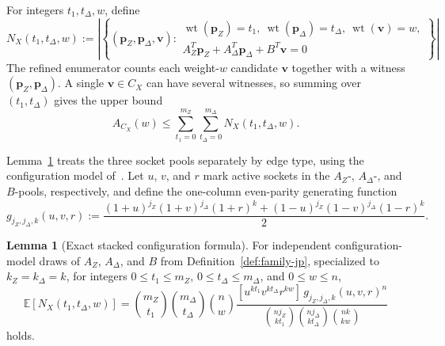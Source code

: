\documentclass[11pt]{article}
\theoremstyle{definition}
\newtheorem{lemma}[theorem]{Lemma}
\newcommand{\EE}{\mathbb E}
\newcommand{\wt}{\operatorname{wt}}
\newcommand{\bp}{\mathbf p}
\newcommand{\bv}{\mathbf v}
\newcommand{\CX}{C_X}
\newcommand{\NX}{N_X}
\begin{document}
For integers \(t_1,t_\Delta,w\), define
\begin{equation*}
\NX(t_1,t_\Delta,w)
:=
\left|
\left\{
(\bp_Z,\bp_\Delta,\bv):
\begin{array}{l}
\wt(\bp_Z)=t_1,\ \wt(\bp_\Delta)=t_\Delta,\ \wt(\bv)=w,\\
A_Z^T \bp_Z+A_\Delta^T \bp_\Delta+B^T \bv=0
\end{array}
\right\}
\right|
\end{equation*}
The refined enumerator counts each weight-\(w\) candidate \(\bv\) together with a witness \((\bp_Z,\bp_\Delta)\). A single \(\bv\in\CX\) can have several witnesses, so summing over \((t_1,t_\Delta)\) gives the upper bound
\[
A_{\CX}(w)\le \sum_{t_1=0}^{m_Z}\sum_{t_\Delta=0}^{m_\Delta}\NX(t_1,t_\Delta,w).
\]

Lemma~\ref{lem:exact-jp} treats the three socket pools separately by edge type, using the configuration model of~\cite[Secs.~3.3--3.4]{RU08}. Let \(u\), \(v\), and \(r\) mark active sockets in the \(A_Z\)-, \(A_\Delta\)-, and \(B\)-pools, respectively, and define the one-column even-parity generating function
\begin{equation}\label{eq:onecol-gen-jp}
g_{j_Z,j_\Delta,k}(u,v,r)
:=
\frac{(1+u)^{j_Z}(1+v)^{j_\Delta}(1+r)^k+(1-u)^{j_Z}(1-v)^{j_\Delta}(1-r)^k}{2}.
\end{equation}

\begin{lemma}[Exact stacked configuration formula]\label{lem:exact-jp}
For independent configuration-model draws of
\(A_Z\), \(A_\Delta\), and \(B\) from Definition~\ref{def:family-jp}, specialized to
\(k_Z=k_\Delta=k\), for integers
\(0\le t_1\le m_Z\), \(0\le t_\Delta\le m_\Delta\), and \(0\le w\le n\),
\begin{equation}\label{eq:exact-stacked-jp}
\EE[\NX(t_1,t_\Delta,w)]
=
\binom{m_Z}{t_1}\binom{m_\Delta}{t_\Delta}\binom{n}{w}
\frac{[u^{kt_1}v^{kt_\Delta}r^{kw}]\,g_{j_Z,j_\Delta,k}(u,v,r)^n}
{\binom{n j_Z}{kt_1}\binom{n j_\Delta}{kt_\Delta}\binom{nk}{kw}}
\end{equation}
holds.
\end{lemma}
\end{document}

